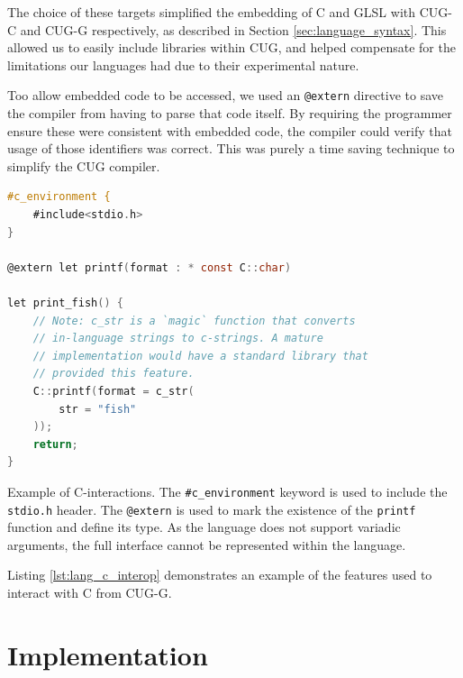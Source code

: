 \documentclass[a4paper,12pt,twoside,openright]{report}
\begin{document}
The choice of these targets simplified the embedding of C and GLSL with CUG-C
and CUG-G respectively, as described in Section \ref{sec:language_syntax}. This
allowed us to easily include libraries within CUG, and helped compensate for
the limitations our languages had due to their experimental nature.

Too allow embedded code to be accessed, we used an \texttt{@extern} directive
to save the compiler from having to parse that code itself. By requiring the
programmer ensure these were consistent with embedded code, the compiler could
verify that usage of those identifiers was correct. This was purely a time
saving technique to simplify the CUG compiler.


\begin{lstfloat}
\begin{lstlisting}[language=C]
#c_environment {
    #include<stdio.h>
}

@extern let printf(format : * const C::char)

let print_fish() {
    // Note: c_str is a `magic` function that converts
    // in-language strings to c-strings. A mature
    // implementation would have a standard library that
    // provided this feature.
    C::printf(format = c_str(
        str = "fish"
    ));
    return;
}
\end{lstlisting}
\caption{Example of C-interactions. The \texttt{\#c\_environment} keyword is
used to include the \texttt{stdio.h} header. The \texttt{@extern} is used to
mark the existence of the \texttt{printf} function and define its type. As the
language does not support variadic arguments, the full interface cannot be
represented within the language.}
\label{lst:lang_c_interop}
\end{lstfloat}

Listing \ref{lst:lang_c_interop} demonstrates an example of the features used
to interact with C from CUG-G.



\chapter{Implementation}

\label{chp:implementation}

\end{document}
